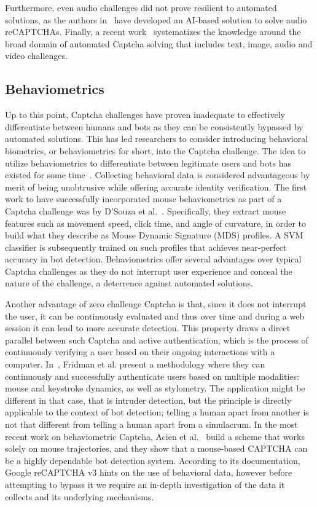 Furthermore, even audio challenges did not prove resilient to automated solutions, as the authors in~\cite{bock2017uncaptcha} have developed an AI-based solution to solve audio reCAPTCHAs.
Finally, a recent work~\cite{dionysiou2020sok} systematizes the knowledge around the broad domain of automated Captcha solving that includes text, image, audio and video challenges.

\subsection{Behaviometrics}

Up to this point, Captcha challenges have proven inadequate to effectively differentiate between humans and bots as they can be consistently bypassed by automated solutions.
This has led researchers to consider introducing behavioral biometrics, or behaviometrics for short, into the Captcha challenge.
The idea to utilize behaviometrics to differentiate between legitimate users and bots has existed for some time~\cite{yampolskiy2006use, chu2013blog}.
Collecting behavioral data is considered advantageous by merit of being unobtrusive while offering accurate identity verification.
The first work to have successfully incorporated mouse behaviometrics as part of a Captcha challenge was by D'Souza et al.~\cite{d2014avatar}.
Specifically, they extract mouse features such as movement speed, click time, and angle of curvature, in order to build what they describe as Mouse Dynamic Signature (MDS) profiles.
A \gls{SVM} classifier is subsequently trained on such profiles that achieves near-perfect accuracy in bot detection.
Behaviometrics offer several advantages over typical Captcha challenges as they do not interrupt user experience and conceal the nature of the challenge, a deterrence against automated solutions.

Another advantage of zero challenge Captcha is that, since it does not interrupt the user, it can be continuously evaluated and thus over time and during a web session it can lead to more accurate detection.
This property draws a direct parallel between such Captcha and active authentication, which is the process of continuously verifying a user based on their ongoing interactions with a computer.
In~\cite{fridman2015multi}, Fridman et al. present a methodology where they can continuously and successfully authenticate users based on multiple modalities: mouse and keystroke dynamics, as well as stylometry.
The application might be different in that case, that is intruder detection, but the principle is directly applicable to the context of bot detection; telling a human apart from another is not that different from telling a human apart from a simulacrum.
In the most recent work on behaviometric Captcha, Acien et al.~\cite{acien2020becaptcha} build a scheme that works solely on mouse trajectories, and they show that a mouse-based CAPTCHA can be a highly dependable bot detection system.
According to its documentation, Google reCAPTCHA v3 hints on the use of behavioral data, however before attempting to bypass it we require an in-depth investigation of the data it collects and its underlying mechanisms.

